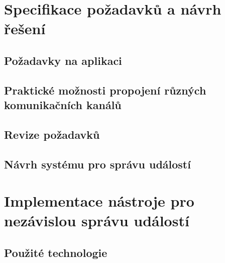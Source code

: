 \documentclass[12pt,oneside,final]{fithesis2}
\begin{document}
\chapter{Specifikace požadavků a návrh řešení}

\section{Požadavky na aplikaci}

\section{Praktické možnosti propojení různých komunikačních kanálů}

\section{Revize požadavků}

\section{Návrh systému pro správu událostí}




\chapter{Implementace nástroje pro nezávislou správu událostí}

\section{Použité technologie}
\end{document}
